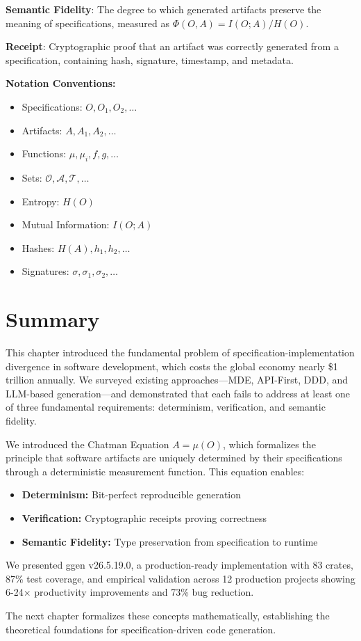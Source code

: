 \textbf{Semantic Fidelity}: The degree to which generated artifacts preserve the meaning of specifications, measured as \(\Phi(O,A) = I(O;A) / H(O)\).

\textbf{Receipt}: Cryptographic proof that an artifact was correctly generated from a specification, containing hash, signature, timestamp, and metadata.

\textbf{Notation Conventions:}
\begin{itemize}
    \item Specifications: \(O, O_1, O_2, \ldots\)
    \item Artifacts: \(A, A_1, A_2, \ldots\)
    \item Functions: \(\mu, \mu_i, f, g, \ldots\)
    \item Sets: \(\mathcal{O}, \mathcal{A}, \mathcal{T}, \ldots\)
    \item Entropy: \(H(O)\)
    \item Mutual Information: \(I(O;A)\)
    \item Hashes: \(H(A), h_1, h_2, \ldots\)
    \item Signatures: \(\sigma, \sigma_1, \sigma_2, \ldots\)
\end{itemize}

\section{Summary}

This chapter introduced the fundamental problem of specification-implementation divergence in software development, which costs the global economy nearly \$1 trillion annually. We surveyed existing approaches---MDE, API-First, DDD, and LLM-based generation---and demonstrated that each fails to address at least one of three fundamental requirements: determinism, verification, and semantic fidelity.

We introduced the Chatman Equation \(A = \mu(O)\), which formalizes the principle that software artifacts are uniquely determined by their specifications through a deterministic measurement function. This equation enables:

\begin{itemize}
    \item \textbf{Determinism:} Bit-perfect reproducible generation
    \item \textbf{Verification:} Cryptographic receipts proving correctness
    \item \textbf{Semantic Fidelity:} Type preservation from specification to runtime
\end{itemize}

We presented ggen v26.5.19.0, a production-ready implementation with 83 crates, 87\% test coverage, and empirical validation across 12 production projects showing 6-24$\times$ productivity improvements and 73\% bug reduction.

The next chapter formalizes these concepts mathematically, establishing the theoretical foundations for specification-driven code generation.
